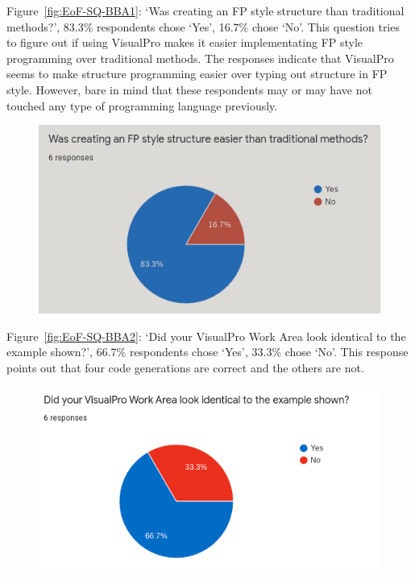 \documentclass[12pt]{report} %
\begin{document}
				Figure~\ref{fig:EoF-SQ-BBA1}: `Was creating an FP style structure than traditional methods?', 83.3\% respondents chose `Yes', 16.7\% chose `No'. This question tries to figure out if using VisualPro makes it easier implementating FP style programming over traditional methods. The responses indicate that VisualPro seems to make structure programming easier over typing out structure in FP style. However, bare in mind that these respondents may or may have not touched any type of programming language previously.

				\begin{figure}[H]
					{\includegraphics[scale=0.50]{Figures/VisualPro-Survey_Results/SQ-BBA1.png}}
				\end{figure}

				Figure~\ref{fig:EoF-SQ-BBA2}: `Did your VisualPro Work Area look identical to the example shown?', 66.7\% respondents chose `Yes', 33.3\% chose `No'. This response points out that four code generations are correct and the others are not.

				\begin{figure}[H]
					{\includegraphics[scale=0.50]{Figures/VisualPro-Survey_Results/SQ-BBA2.png}}
				\end{figure}
				
\end{document}
